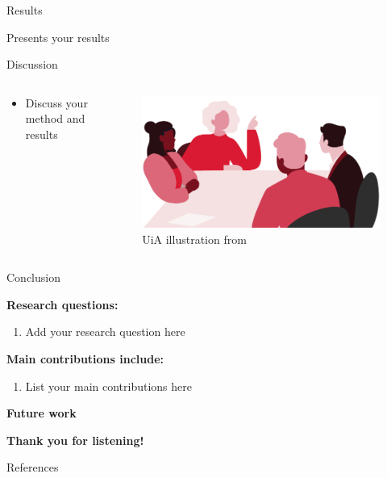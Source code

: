 \documentclass[10pt,aspectratio=169]{beamer}
\begin{document}
\begin{frame}{Results}

Presents your results
    
\end{frame}


\begin{frame}{Discussion}

\begin{columns}
    \begin{column}{0.5\textwidth}
        \begin{itemize}
            \setlength{\itemsep}{1em}
            \item Discuss your method and results
        \end{itemize}
    \end{column}

    \begin{column}{0.5\textwidth}
    \vspace{-1.8em}
    \begin{figure}
        \includegraphics[width=0.95\linewidth]{source/Attraktive studier.pdf}
        \vspace{-1em}
        \caption{UiA illustration from \cite{uia_illustrasjoner}}
    \end{figure}
\end{column}

\end{columns}


    
\end{frame}


\begin{frame}{Conclusion}

\textbf{Research questions:}
\begin{enumerate}
    \item Add your research question here
\end{enumerate}

\textbf{Main contributions include:}

\begin{enumerate}
    \item List your main contributions here
\end{enumerate}

\textbf{Future work}

\end{frame}

\begin{frame}[plain]
    \centering
    \vfill
    {\LARGE \textbf{Thank you for listening!}}
    \vfill
\end{frame}

\begin{frame}[allowframebreaks]{References}
    \printbibliography
\end{frame}
\end{document}
